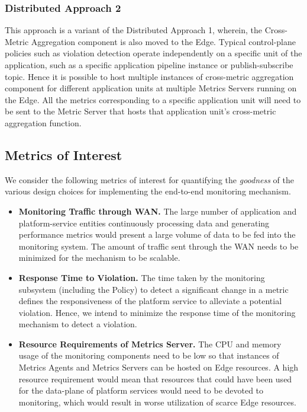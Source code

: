 \subsubsection{Distributed Approach 2}
This approach is a variant of the Distributed Approach 1, wherein, the Cross-Metric Aggregation component is also moved to the Edge. Typical control-plane policies such as violation detection operate independently on a specific unit of the application, such as a specific application pipeline instance or publish-subscribe topic. Hence it is possible to host multiple instances of cross-metric aggregation component for different application units at multiple Metrics Servers running on the Edge. All the metrics corresponding to a specific application unit will need to be sent to the Metric Server that hosts that application unit's cross-metric aggregation function. 

\subsection{Metrics of Interest}
We consider the following metrics of interest for quantifying the \textit{goodness} of the various design choices for implementing the end-to-end monitoring mechanism.
\begin{itemize}
\item \textbf{Monitoring Traffic through WAN. } The large number of application and platform-service entities continuously processing data and generating performance metrics would present a large volume of data to be fed into the monitoring system. The amount of traffic sent through the WAN needs to be minimized for the mechanism to be scalable.
\item \textbf{Response Time to Violation. }The time taken by the monitoring subsystem (including the Policy) to detect a significant change in a metric defines the responsiveness of the platform service to alleviate a potential violation. Hence, we intend to minimize the response time of the monitoring mechanism to detect a violation.
\item \textbf{Resource Requirements of Metrics Server. } The CPU and memory usage of the monitoring components need to be low so that instances of Metrics Agents and Metrics Servers can be hosted on Edge resources. A high resource requirement would mean that resources that could have been used for the data-plane of platform services would need to be devoted to monitoring, which would result in worse utilization of scarce Edge resources.
\end{itemize}

